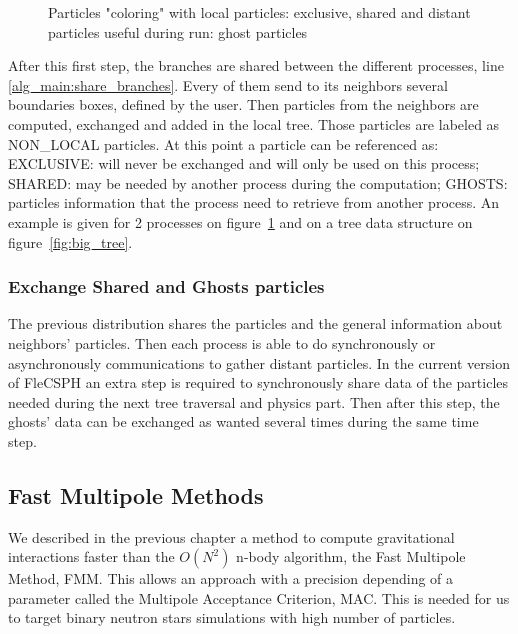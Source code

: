 \begin{figure}[t!]
\centering

\caption[Particle coloring based on FleCSI]{Particles "coloring" with local particles: exclusive, shared and distant particles useful during run: ghost particles}
\label{fig:coloring_particles}
\end{figure}

After this first step, the branches are shared between the different processes, line \ref{alg_main:share_branches}. 
Every of them send to its neighbors several boundaries boxes, defined by the user. 
Then particles from the neighbors are computed, exchanged and added in the local tree. 
Those particles are labeled as NON\_LOCAL particles. 
At this point a particle can be referenced as: EXCLUSIVE: will never be exchanged and will only be used on this process; SHARED: may be needed by another process during the computation; GHOSTS: particles information that the process need to retrieve from another process. 
An example is given for 2 processes on figure~\ref{fig:coloring_particles} and on a tree data structure on figure~\ref{fig:big_tree}.

\subsubsection{Exchange Shared and Ghosts particles}

The previous distribution shares the particles and the general information about neighbors’ particles. 
Then each process is able to do synchronously or asynchronously communications to gather distant particles. 
In the current version of FleCSPH an extra step is required to synchronously share data of the particles needed during the next tree traversal and physics part. 
Then after this step, the ghosts’ data can be exchanged as wanted several times during the same time step. 

\subsection{Fast Multipole Methods}

We described in the previous chapter a method to compute gravitational interactions faster than the $O(N^2)$ n-body algorithm, the Fast Multipole Method, FMM.
This allows an approach with a precision depending of a parameter called the Multipole Acceptance Criterion, MAC. 
This is needed for us to target binary neutron stars simulations with high number of particles.

